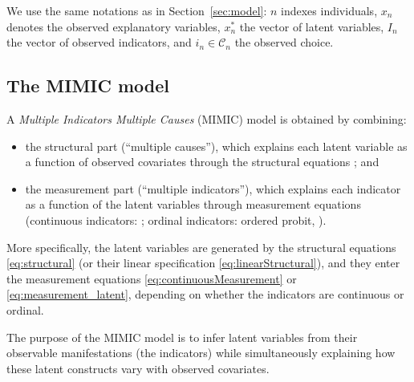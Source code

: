 \documentclass[12pt,a4paper]{article}
\begin{document}
We use the same notations as in Section~\ref{sec:model}: $n$ indexes
individuals, $x_n$ denotes the observed explanatory variables, $x_n^*$
the vector of latent variables, $I_n$ the vector of observed
indicators, and $i_n\in\mathcal C_n$ the observed choice.

\subsection{The MIMIC model}
\label{sec:mimic}

A \emph{Multiple Indicators Multiple Causes} (MIMIC) model is obtained
by combining:
\begin{itemize}
  \item the structural part (``multiple causes''), which explains each
    latent variable as a function of observed covariates through the
    structural equations ; and
  \item the measurement part (``multiple indicators''), which explains
    each indicator as a function of the latent variables through
    measurement equations (continuous indicators:
    ; ordinal indicators: ordered probit,
    ).
\end{itemize}

More specifically, the latent variables are generated by the
structural equations \eqref{eq:structural} (or their linear
specification \eqref{eq:linearStructural}), and they enter the
measurement equations \eqref{eq:continuousMeasurement} or
\eqref{eq:measurement_latent}, depending on whether the indicators are
continuous or ordinal.

The purpose of the MIMIC model is to infer latent variables from their
observable manifestations (the indicators) while simultaneously
explaining how these latent constructs vary with observed covariates.
\end{document}
